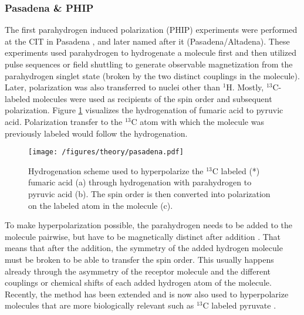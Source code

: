         \subsubsection{Pasadena \& PHIP}
        The first parahydrogen induced polarization (PHIP) experiments were performed at the CIT in Pasadena \cite{bowers_parahydrogen_1987-2}, and later named after it (Pasadena/Altadena). These experiments used parahydrogen to hydrogenate a molecule first and then utilized pulse sequences or field shuttling to generate observable magnetization from the parahydrogen singlet state (broken by the two distinct couplings in the molecule). Later, polarization was also transferred to nuclei other than $^{1}$H. Mostly, $^{13}$C-labeled molecules were used as recipients of the spin order and subsequent polarization. Figure \ref{fig:theory:pasadena} visualizes the hydrogenation of fumaric acid to pyruvic acid. Polarization transfer to the $^{13}$C atom with which the molecule was previously labeled would follow the hydrogenation.
        \begin{figure}
            \centering
            \texttt{[image: /figures/theory/pasadena.pdf]}
            \caption[Pasadena hyperpolarization]{Hydrogenation scheme used to hyperpolarize the $^{13}$C labeled (*) fumaric acid (a) through hydrogenation with parahydrogen to pyruvic acid (b). The spin order is then converted into polarization on the labeled atom in the molecule (c).}
            \label{fig:theory:pasadena}
        \end{figure}
        To make hyperpolarization possible, the parahydrogen needs to be added to the molecule pairwise, but have to be magnetically distinct after addition \cite{eisenberg_parahydrogen-induced_1991}. That means that after the addition, the symmetry of the added hydrogen molecule must be broken to be able to transfer the spin order. This usually happens already through the asymmetry of the receptor molecule and the different couplings or chemical shifts of each added hydrogen atom of the molecule. Recently, the method has been extended and is now also used to hyperpolarize molecules that are more biologically relevant such as $^{13}$C labeled pyruvate \cite{cavallari_metabolic_2019}.
